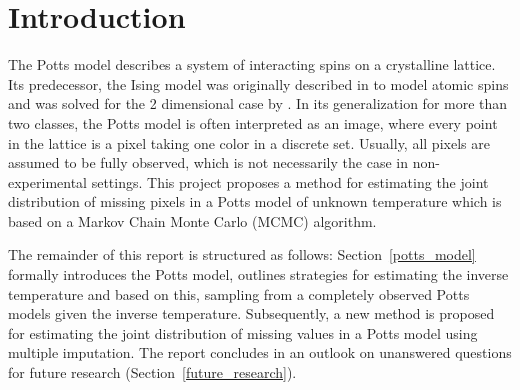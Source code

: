 \documentclass[12pt, twoside]{article}
\newcommand{\1}{\mathbb{1}}
\begin{document}
\section{Introduction}
The Potts model describes a system of interacting spins on a crystalline lattice. Its predecessor, the Ising model  was originally described in \cite{lenz1920beitrage} to model 
atomic spins
and was solved for the 2 dimensional case by \cite{onsager1944crystal}. 
In its generalization for more than two classes, the Potts model is often interpreted as an image, where every point in the lattice is a pixel taking one color in a discrete set.
Usually, all pixels are assumed to be fully observed, which is not necessarily the case in non-experimental settings.
This project proposes a method for estimating the joint distribution of missing pixels in a Potts model of unknown temperature which is based on a Markov Chain Monte Carlo (MCMC) algorithm.

The remainder of this report is structured as follows: Section~\ref{potts_model} formally introduces the Potts model, 
outlines strategies for estimating the inverse temperature and based on this,
sampling from a completely observed Potts models given the inverse temperature. Subsequently, a new method is proposed for estimating the joint distribution of missing values in a Potts model using multiple imputation.
The report concludes in an outlook on unanswered questions for future research (Section~\ref{future_research}).





\clearpage
\end{document}
